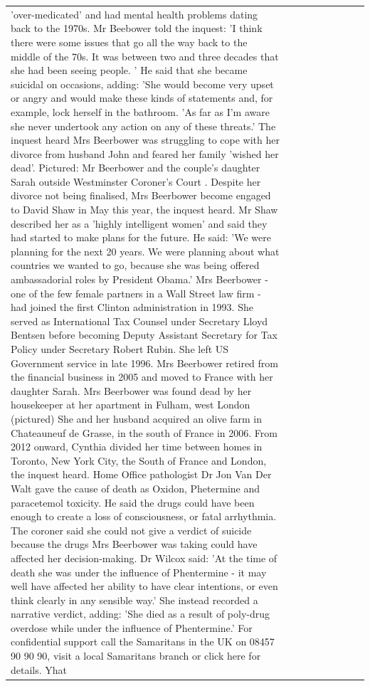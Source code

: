 \begin{table}[H]
\begin{tabular}{lllrlllll}
'over-medicated' and had mental health problems dating back to the 1970s. Mr Beebower told the inquest: 'I think there were some issues that go all the way back to the middle of the 70s. It was between two and three decades that she had been seeing people. ' He said that she became suicidal on occasions, adding: 'She would become very upset or angry and would make these kinds of statements and, for example, lock herself in the bathroom. 'As far as I'm aware she never undertook any action on any of these threats.' The inquest heard Mrs Beerbower was struggling to cope with her divorce from husband John and feared her family 'wished her dead'. Pictured: Mr Beerbower and the couple's daughter Sarah outside Westminster Coroner's Court . Despite her divorce not being finalised, Mrs Beerbower become engaged to David Shaw in May this year, the inquest heard. Mr Shaw described her as a 'highly intelligent women' and said they had started to make plans for the future. He said: 'We were planning for the next 20 years. We were planning about what countries we wanted to go, because she was being offered ambassadorial roles by President Obama.' Mrs Beerbower - one of the few female partners in a Wall Street law firm - had joined the first Clinton administration in 1993. She served as International Tax Counsel under Secretary Lloyd Bentsen before becoming Deputy Assistant Secretary for Tax Policy under Secretary Robert Rubin. She left US Government service in late 1996. Mrs Beerbower retired from the financial business in 2005 and moved to France with her daughter Sarah. Mrs Beerbower was found dead by her housekeeper at her apartment in Fulham, west London (pictured) She and her husband acquired an olive farm in Chateauneuf de Grasse, in the south of France in 2006. From 2012 onward, Cynthia divided her time between homes in Toronto, New York City, the South of France and London, the inquest heard. Home Office pathologist Dr Jon Van Der Walt gave the cause of death as Oxidon, Phetermine and paracetemol toxicity. He said the drugs could have been enough to create a loss of consciousness, or fatal arrhythmia. The coroner said she could not give a verdict of suicide because the drugs Mrs Beerbower was taking could have affected her decision-making. Dr Wilcox said: 'At the time of death she was under the influence of Phentermine - it may well have affected her ability to have clear intentions, or even think clearly in any sensible way.' She instead recorded a narrative verdict, adding: 'She died as a result of poly-drug overdose while under the influence of Phentermine.' For confidential support call the Samaritans in the UK on 08457 90 90 90, visit a local Samaritans branch or click here for details. Yhat \\

\end{tabular}
\end{table}
